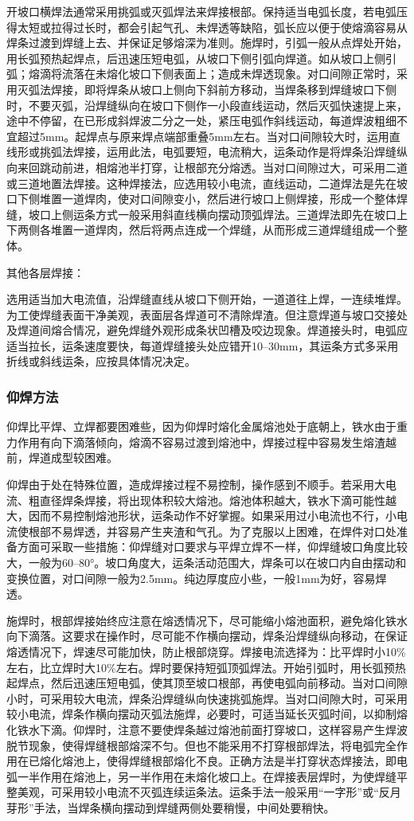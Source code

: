 \documentclass{ctexbook}
\begin{document}
开坡口横焊法通常采用挑弧或灭弧焊法来焊接根部。保持适当电弧长度，若电弧压得太短或拉得过长时，都会引起气孔、未焊透等缺陷，弧长应以便于使熔滴容易从焊条过渡到焊缝上去、并保证足够熔深为准则。施焊时，引弧一般从点焊处开始，用长弧预热起焊点，后迅速压短电弧，从坡口下侧引弧向焊道。如从坡口上侧引弧；熔滴将流落在未熔化坡口下侧表面上；造成未焊透现象。对口间隙正常时，采用灭弧法焊接，即将焊条从坡口上侧向下斜前方移动，当焊条移到焊缝坡口下侧时，不要灭弧，沿焊缝纵向在坡口下侧作一小段直线运动，然后灭弧快速提上来，途中不停留，在已形成斜焊波二分之一处，紧压电弧作斜线运动，每道焊波粗细不宜超过5mm。起焊点与原来焊点端部重叠5mm左右。当对口间隙较大时，运用直线形或挑弧法焊接，运用此法，电弧要短，电流稍大，运条动作是将焊条沿焊缝纵向来回跳动前进，相熔池半打穿，让根部充分熔透。当对口间隙过大，可采用二道或三道地置法焊接。这种焊接法，应选用较小电流，直线运动，二道焊法是先在坡口下侧堆置一道焊肉，使对口间隙变小，然后进行坡口上侧焊接，形成一个整体焊缝，坡口上侧运条方式一般采用斜直线横向摆动顶弧焊法。三道焊法即先在坡口上下两侧各堆置一道焊肉，然后将两点连成一个焊缝，从而形成三道焊缝组成一个整体。

其他各层焊接：

选用适当加大电流值，沿焊缝直线从坡口下侧开始，一道道往上焊，一连续堆焊。为工使焊缝表面干净美观，表面层各焊道可不清除焊渣。但注意焊道与坡口交接处及焊道间熔合情况，避免焊缝外观形成条状凹槽及咬边现象。焊道接头时，电弧应适当拉长，运条速度要快，每道焊缝接头处应错开10--30mm，其运条方式多采用折线或斜线运条，应按具体情况决定。
\subsubsection{仰焊方法}
仰焊比平焊、立焊都要困难些，因为仰焊时熔化金属熔池处于底朝上，铁水由于重力作用有向下滴落倾向，熔滴不容易过渡到熔池中，焊接过程中容易发生熔渣越前，焊道成型较困难。

仰焊由于处在特殊位置，造成焊接过程不易控制，操作感到不顺手。若采用大电流、粗直径焊条焊接，将出现体积较大熔池。熔池体积越大，铁水下滴可能性越大，因而不易控制熔池形状，运条动作不好掌握。如果采用过小电流也不行，小电流使根部不易焊透，并容易产生夹渣和气孔。为了克服以上困难，在焊件对口处准备方面可采取一些措施：仰焊缝对口要求与平焊立焊不一样，仰焊缝坡口角度比较大，一般为60--80°。坡口角度大，运条活动范围大，焊条可以在坡口内自由摆动和变换位置，对口间隙一般为2.5mm。纯边厚度应小些，一般1mm为好，容易焊透。

施焊时，根部焊接始终应注意在熔透情况下，尽可能缩小熔池面积，避免熔化铁水向下滴落。这要求在操作时，尽可能不作横向摆动，焊条沿焊缝纵向移动，在保证熔透情况下，焊速尽可能加快，防止根部烧穿。焊接电流选择为：比平焊时小10\%左右，比立焊时大10\%左右。焊时要保持短弧顶弧焊法。开始引弧时，用长弧预热起焊点，然后迅速压短电弧，使其顶至坡口根部，再使电弧向前移动。当对口间隙小时，可采用较大电流，焊条沿焊缝纵向快速挑弧施焊。当对口间隙大时，可采用较小电流，焊条作横向摆动灭弧法施焊，必要时，可适当延长灭弧时间，以抑制熔化铁水下滴。仰焊时，注意不要使焊条越过熔池前面打穿坡口，这样容易产生焊波脱节现象，使得焊缝根部熔深不匀。但也不能采用不打穿根部焊法，将电弧完全作用在已熔化熔池上，使得焊缝根部熔化不良。正确方法是半打穿状态焊接法，即电弧一半作用在熔池上，另一半作用在未熔化坡口上。在焊接表层焊时，为使焊缝平整美观，可采用较小电流不灭弧连续运条法。运条手法一般采用“一字形”或“反月芽形”手法，当焊条横向摆动到焊缝两侧处要稍慢，中间处要稍快。
\end{document}
